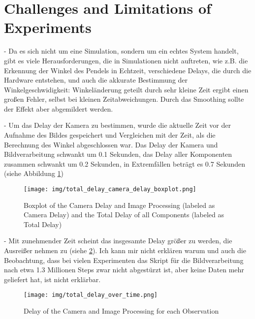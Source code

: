 \section{Challenges and Limitations of Experiments}
- Da es sich nicht um eine Simulation, sondern um ein echtes System handelt, gibt es viele Herausforderungen, die in Simulationen nicht auftreten, wie z.B. die Erkennung der Winkel des Pendels in Echtzeit, verschiedene Delays, die durch die Hardware entstehen, und auch die akkurate Bestimmung der Winkelgeschwidigkeit: Winkeländerung geteilt durch sehr kleine Zeit ergibt einen großen Fehler, selbst bei kleinen Zeitabweichungen. Durch das Smoothing sollte der Effekt aber abgemildert werden.

- Um das Delay der Kamera zu bestimmen, wurde die aktuelle Zeit vor der Aufnahme des Bildes gespeichert und Vergleichen mit der Zeit, als die Berechnung des Winkel abgeschlossen war. Das Delay der Kamera und Bildverarbeitung schwankt um 0.1 Sekunden, das Delay aller Komponenten zusammen schwankt um 0.2 Sekunden, in Extremfällen beträgt es 0.7 Sekunden (siehe Abbildung \ref{fig:camera_delay_boxplot})
\begin{figure}
    \centering
    \texttt{[image: img/total\_delay\_camera\_delay\_boxplot.png]}
    \caption{Boxplot of the Camera Delay and Image Processing (labeled as Camera Delay) and the Total Delay of all Components (labeled as Total Delay)}
    \label{fig:camera_delay_boxplot}
\end{figure}
- Mit zunehmender Zeit scheint das insgesamte Delay größer zu werden, die Ausreißer nehmen zu (siehe \ref{fig:total_delay_over_time}). Ich kann mir nicht erklären warum und auch die Beobachtung, dass bei vielen Experimenten das Skript für die Bildverarbeitung nach etwa 1.3 Millionen Steps zwar nicht abgestürzt ist, aber keine Daten mehr geliefert hat, ist nicht erklärbar.
\begin{figure}
    \centering
    \texttt{[image: img/total\_delay\_over\_time.png]}
    \caption{Delay of the Camera and Image Processing for each Observation}
    \label{fig:total_delay_over_time}
\end{figure}
